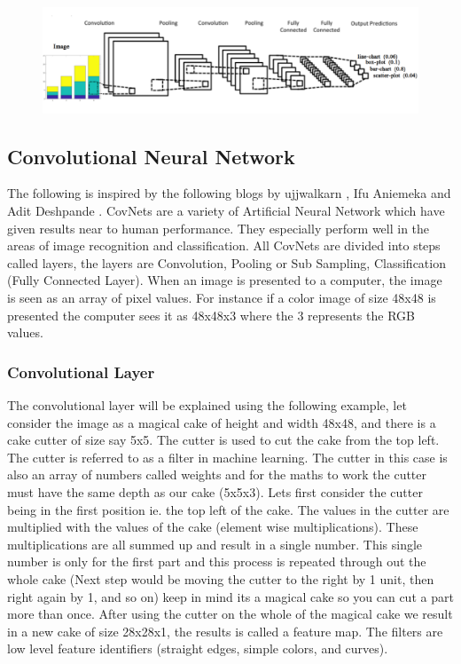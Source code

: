 \documentclass[12pt, a4paper,oneside]{report}
\begin{document}
\begin{figure}
\includegraphics [scale=0.4] {architecture}
\label{fig:archi}
\end{figure}


\subsection{Convolutional Neural Network}
The following is inspired by the following blogs by ujjwalkarn \cite{cnnonline}, Ifu Aniemeka\cite{AFriendl79} and Adit Deshpande \cite{convo:online}.
CovNets are a variety of Artificial Neural Network which have given results near to human performance. They  especially perform well in the areas of image recognition and classification. All CovNets are divided into steps called layers, the layers are Convolution, Pooling or Sub Sampling, Classification (Fully Connected Layer). When an image is presented to a computer, the image is seen as an array of pixel values. For instance if a  color image of size 48x48 is presented the computer sees it as 48x48x3 where the 3 represents the RGB values. 

\subsubsection{Convolutional Layer}
The convolutional layer will be explained using the following example, let consider the image as a magical cake of height and width 48x48, and there is a cake cutter of size say 5x5. The cutter is used to cut the cake from the top left. The cutter is referred to as a filter in machine learning. The cutter in this case is also an array of numbers called weights and for the maths to work the cutter must have the same depth as our cake (5x5x3).
Lets first consider the cutter being in the first position ie. the top left of the cake. The values in the cutter are multiplied with the values of the cake (element wise multiplications). These multiplications are all summed up and result in a single number. This single number is only for the first part and this process is repeated through out the whole cake (Next step would be moving the cutter to the right by 1 unit, then right again by 1, and so on) keep in mind its a magical cake so you can cut a part more than once. After using the cutter on the whole of the magical cake we result in a new cake of size 28x28x1, the results is called a feature map. The filters are low level feature identifiers (straight edges, simple colors, and curves). 
\end{document}
